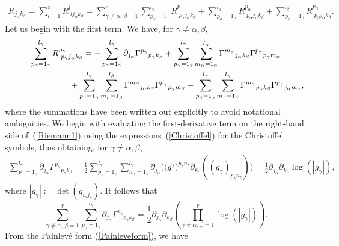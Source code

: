 \documentclass[11pt]{article}
\numberwithin{equation}{section}
\newcommand{\jalpha}{j_{\alpha}}
\newcommand{\kbeta}{k_{\beta}}
\newcommand{\pgamma}{p_{\gamma}}
\newcommand{\malpha}{m_{\alpha}}
\newcommand{\mbeta}{m_{\beta}}
\newcommand{\mgamma}{m_{\gamma}}
\newcommand{\lbeta}{l_{\beta}}
\newcommand{\lalpha}{l_{\alpha}}
\newcommand{\palpha}{p_{\alpha}}
\newcommand{\pbeta}{p_{\beta}}
\newcommand{\ngamma}{n_{\gamma}}
\newcommand{\igamma}{i_{\gamma}}
\newcommand{\jgamma}{j_{\gamma}}
\newcommand{\lgamma}{l_{\gamma}}
\begin{document}
\begin{gather}\label{Riccidecomp}
R_{\jalpha \kbeta}=\sum_{l=1}^{n}R^{l}_{{\phantom l} l \jalpha \kbeta}=\sum_{\gamma \neq \alpha,\, \beta=1}^{r}\sum_{\pgamma=1_{\gamma}}^{\lgamma}R^{\pgamma}_{{\phantom l} \pgamma \jalpha \kbeta} + \sum_{\palpha =1_{\alpha}}^{\lalpha}R^{\palpha}_{{\phantom l} \palpha \jalpha \kbeta}+\sum_{\pbeta=1_{\beta}}^{\lbeta}R^{\pbeta}_{{\phantom l} \pbeta \jalpha \kbeta}.
\end{gather}
Let us begin with the first term. We have, for $\gamma\neq \alpha, \beta$,
\begin{gather}
\sum_{\pgamma = 1_{\gamma}}^{\lgamma}R^{\pgamma}_{{\phantom l} \pgamma \jalpha \kbeta}=-\sum_{\pgamma = 1_{\gamma}}^{\lgamma}\partial_{\jalpha}{\Gamma^{\pgamma}}_{\pgamma \kbeta} +\sum_{\pgamma = 1_{\gamma}}^{\lgamma}\sum_{\malpha=1_{\alpha}}^{\lalpha}{\Gamma^{\malpha}}_{\jalpha \kbeta}{\Gamma^{\pgamma}}_{\pgamma \malpha}\nonumber\\
\hphantom{\sum_{\pgamma = 1_{\gamma}}^{\lgamma}R^{\pgamma}_{{\phantom l} \pgamma \jalpha \kbeta}=}{}
+\sum_{\pgamma = 1_{\gamma}}^{\lgamma}\sum_{\mbeta=1_{\beta}}^{\lbeta}{\Gamma^{\mbeta}}_{\jalpha \kbeta}{\Gamma^{\pgamma}}_{\pgamma \mbeta} -\sum_{\pgamma = 1_{\gamma}}^{\lgamma}\sum_{\mgamma=1_{\gamma}}^{\lgamma}{\Gamma^{\mgamma}}_{\pgamma \kbeta}{\Gamma^{\pgamma}}_{\jalpha \mgamma},\label{Riemann1}
\end{gather}
where the summations have been written out explicitly to avoid notational ambiguities. We begin with evaluating the first-derivative term on the right-hand side of~(\ref{Riemann1}) using the expressions~(\ref{Christoffel}) for the Christoffel symbols, thus obtaining, for $\gamma \neq \alpha, \beta$,
\begin{gather}\label{derivgamma}
\sum_{\pgamma = 1_{\gamma}}^{\lgamma}\partial_{\jalpha}{\Gamma^{\pgamma}}_{\pgamma \kbeta} = \frac{1}{2}\sum_{\pgamma = 1_{\gamma}}^{\lgamma}\sum_{\ngamma = 1_{\gamma}}^{\lgamma}\partial_{\jalpha}\big(\big(g^{\gamma}\big)^{\pgamma \ngamma}\partial_{\kbeta}((g_{\gamma})_{\pgamma \ngamma})\big)=\frac{1}{2}\partial_{\jalpha}\partial_{\kbeta}\log(|g_{\gamma}|),
\end{gather}
where $|g_{\gamma}|:=\det(g_{\igamma \jgamma})$. It follows that
\[
\sum_{\gamma \neq \alpha,\, \beta=1}^{r}\sum_{\pgamma=1_{\gamma}}^{\lgamma}\partial_{\jalpha}{\Gamma^{\pgamma}}_{\pgamma \kbeta}= \frac{1}{2}\partial_{\jalpha}\partial_{\kbeta}\left(\prod_{\gamma \neq \alpha, \,\beta=1}^{r}\log(|g_{\gamma}|)\right).
\]
From the Painlev\'e form (\ref{Painleveform}), we have
\end{document}
